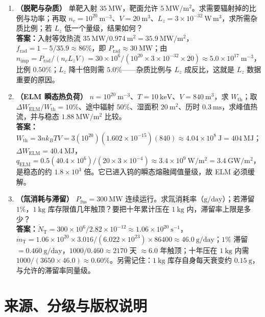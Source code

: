 \begin{enumerate}
\item \textbf{（脱靶与杂质）} 单靶入射 $35\ \mathrm{MW}$，靶面允许 $5\ \mathrm{MW/m^2}$。求需要辐射掉的比例与功率；再取 $n_e=10^{20}\ \mathrm{m^{-3}}$、$V=20\ \mathrm{m^3}$、$L_z=3\times10^{-32}\ \mathrm{W\,m^3}$，求所需杂质比例；若 $L_z$ 低一个量级，结果如何？\\
\textbf{答案：}入射等效热流 $35\ \mathrm{MW}/0.974\ \mathrm{m^2}=35.9\ \mathrm{MW/m^2}$，$f_{\mathrm{rad}}=1-5/35.9\approx86\%$，即 $P_{\mathrm{rad}}\approx30\ \mathrm{MW}$；由 $n_{\mathrm{imp}}=P_{\mathrm{rad}}/(n_eL_zV)=30\times10^{6}/(10^{20}\times3\times10^{-32}\times20)\approx5.0\times10^{17}\ \mathrm{m^{-3}}$，比例 $0.50\%$；$L_z$ 降十倍则需 $5.0\%$——杂质比例与 $L_z$ 成反比，这就是 $L_z$ 数据重要的原因。

\item \textbf{（ELM 瞬态热负荷）} $n=10^{20}\ \mathrm{m^{-3}}$、$T=10\ \mathrm{keV}$、$V=840\ \mathrm{m^3}$，求 $W_{\mathrm{th}}$；取 $\Delta W_{\mathrm{ELM}}/W_{\mathrm{th}}=10\%$、途中辐射 $50\%$、湿面积 $20\ \mathrm{m^2}$、历时 $0.3\ \mathrm{ms}$，求峰值热流，并与稳态 $1.88\ \mathrm{MW/m^2}$ 比较。\\
\textbf{答案：}$W_{\mathrm{th}}=3nk_BTV=3(10^{20})(1.602\times10^{-15})(840)\approx4.04\times10^{8}\ \mathrm{J}=404\ \mathrm{MJ}$；$\Delta W_{\mathrm{ELM}}=40.4\ \mathrm{MJ}$，$q_{\mathrm{ELM}}=0.5(40.4\times10^{6})/(20\times3\times10^{-4})\approx3.4\times10^{9}\ \mathrm{W/m^2}=3.4\ \mathrm{GW/m^2}$，是稳态的约 $1.8\times10^{3}$ 倍。它已进入钨的瞬态熔融阈值量级，故 ELM 必须缓解。

\item \textbf{（氚消耗与滞留）} $P_{\mathrm{fus}}=300\ \mathrm{MW}$ 连续运行。求氚消耗率（$\mathrm{g/day}$）；若滞留 $1\%$，$1\ \mathrm{kg}$ 库存限值几年触顶？要把十年累计压在 $1\ \mathrm{kg}$ 内，滞留率上限是多少？\\
\textbf{答案：}$\dot{N}_{\mathrm{T}}=300\times10^{6}/2.82\times10^{-12}\approx1.06\times10^{20}\ \mathrm{s^{-1}}$，$\dot{m}_{\mathrm{T}}=1.06\times10^{20}\times3.016/(6.022\times10^{23})\times86400\approx46.0\ \mathrm{g/day}$；$1\%$ 滞留 $=0.460\ \mathrm{g/day}$，$1000/0.460\approx2170$ 天 $\approx6.0$ 年触顶；十年压在 $1\ \mathrm{kg}$ 内需 $1000/(3650\times46.0)\approx0.60\%$。另需记住：$1\ \mathrm{kg}$ 库存自身每天衰变约 $0.15\ \mathrm{g}$，与允许的滞留率同量级。
\end{enumerate}


\section{来源、分级与版权说明}

